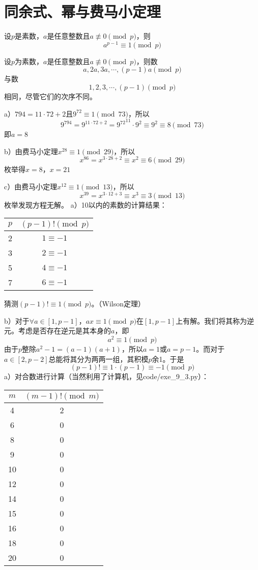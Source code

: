 \chapter{同余式、幂与费马小定理}
\begin{theorem}[费马小定理]
设$p$是素数，$a$是任意整数且$a\not\equiv0\pmod p$，则
\[a^{p-1}\equiv 1\pmod p\]
\end{theorem}
\begin{lemma}
设$p$为素数，$a$是任意整数且$a\not\equiv0\pmod p$，则数
\[a,2a,3a,\cdots,(p-1)a\pmod p\]
与数
\[1,2,3,\cdots,(p-1)\pmod p\]
相同，尽管它们的次序不同。
\end{lemma}
%
\exercise a）$794=11\cdot72+2$且$9^{72}\equiv1\pmod{73}$，所以
\[9^{794}=9^{11\cdot72+2}={9^{72}}^{11}\cdot9^2\equiv9^2\equiv8\pmod {73}\]
即$a=8$\par
b）由费马小定理$x^{28}\equiv1\pmod{29}$，所以
\[x^{86}=x^{3\cdot28+2}\equiv x^2\equiv6\pmod{29}\]
枚举得$x=8$，$x=21$\par
c）由费马小定理$x^{12}\equiv1\pmod{13}$，所以
\[x^{39}=x^{3\cdot12+3}\equiv x^3\equiv3\pmod{13}\]
枚举发现方程无解。
%
\exercise a）10以内的素数的计算结果：
\begin{center}
\begin{tabular}{c|c}
$p$ & $(p-1)!\pmod p$ \\
\hline
2 & $1\equiv -1$ \\
3 & $2\equiv -1$ \\
5 & $4\equiv -1$ \\
7 & $6\equiv -1$ \\
\end{tabular}
\end{center}
猜测$(p-1)!\equiv 1\pmod p$。（Wilson定理）\par
b）对于$\forall a\in [1, p-1]$，$ax\equiv1\pmod p$在$[1, p-1]$上有解。我们将其称为逆元。考虑是否存在逆元是其本身的$a$，即
\[a^2\equiv 1\pmod p\]
由于$p$整除$a^2-1=(a-1)(a+1)$，所以$a=1$或$a=p-1$。而对于$a\in [2, p-2]$总能将其分为两两一组，其积模$p$余1。于是
\[(p-1)!\equiv 1\cdot(p-1)\equiv -1\pmod p\]
%
\exercise a）对合数进行计算（当然利用了计算机，见code/exe\_9\_3.py）：
\begin{center}
\begin{tabular}{c|c}
$m$ & $(m-1)!\pmod m$ \\
\hline
4 & 2 \\
6 & 0 \\
8 & 0 \\
9 & 0 \\
10 & 0 \\
12 & 0 \\
14 & 0 \\
15 & 0 \\
16 & 0 \\
18 & 0 \\
20 & 0 \\
\end{tabular}
\end{center}
